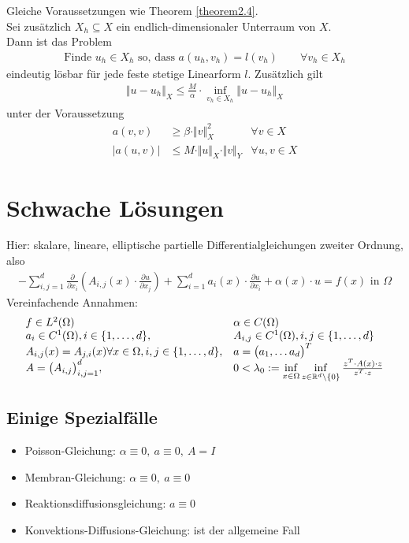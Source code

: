 \begin{theorem} %
Gleiche Voraussetzungen wie Theorem \ref{theorem2.4}.\\
Sei zusätzlich $X_h\subseteq X$ ein endlich-dimensionaler Unterraum von $X$.\\
Dann ist das Problem
\begin{align*}
\text{Finde }u_h\in X_h\text{ so, dass }
a(u_h,v_h)=l(v_h)\qquad\forall v_h\in X_h
\end{align*}
eindeutig lösbar für jede feste stetige Linearform $l$. Zusätzlich gilt
\begin{align*}
\Vert u-u_h\Vert_X\leq\frac{M}{\alpha}\cdot\inf\limits_{v_h\in X_h}\Vert u-u_h\Vert_X
\end{align*}
unter der Voraussetzung
\begin{align*}
a(v,v)&\geq\beta\cdot\Vert v\Vert^2_X &\forall v\in X\\
\big|a(u,v)\big|&\leq M\cdot\Vert u\Vert_X\cdot\Vert v\Vert_Y &\forall u,v\in X
\end{align*}
\end{theorem}

\section{Schwache Lösungen} %
Hier: skalare, lineare, elliptische partielle Differentialgleichungen zweiter Ordnung, also
\begin{align*}
-\sum\limits_{i,j=1}^d\frac{\partial}{\partial x_i}\left(A_{i,j}(x)\cdot\frac{\partial u}{\partial x_j}\right)+\sum\limits_{i=1}^d a_i(x)\cdot\frac{\partial u}{\partial x_i}+\alpha(x)\cdot u=f(x)\text{ in }\Omega
\end{align*}
Vereinfachende Annahmen:
\begin{align*}
\begin{array}{ll}
	f\in L^2(\Omega)&\alpha \in C(\Omega)\\
	a_i\in C^1(\Omega),i\in\lbrace1,\ldots,d\rbrace, & A_{i,j}\in C^1(\Omega), i,j\in\lbrace1,\ldots,d\rbrace\\
	A_{i,j}(x)=A_{j,i}(x)\forall x\in\Omega, i,j\in\lbrace1,\ldots,d\rbrace, & a=\big(a_1,\ldots a_d\big)^T\\
	A=\big(A_{i,j}\big)^d_{i,j=1},& 0<\lambda_0:=\inf\limits_{x\in\Omega}\inf\limits_{z\in\mathbb{R}^d\setminus\lbrace0\rbrace}\frac{z^T\cdot A(x)\cdot z}{z^T\cdot z}
\end{array}
\end{align*}

\subsection*{Einige Spezialfälle}
\begin{itemize}
\item Poisson-Gleichung: $\alpha\equiv 0,~a\equiv0,~A=I$
\item Membran-Gleichung: $\alpha\equiv0,~a\equiv 0$
\item Reaktionsdiffusionsgleichung: $a\equiv 0$
\item Konvektions-Diffusions-Gleichung: ist der allgemeine Fall
\end{itemize}


